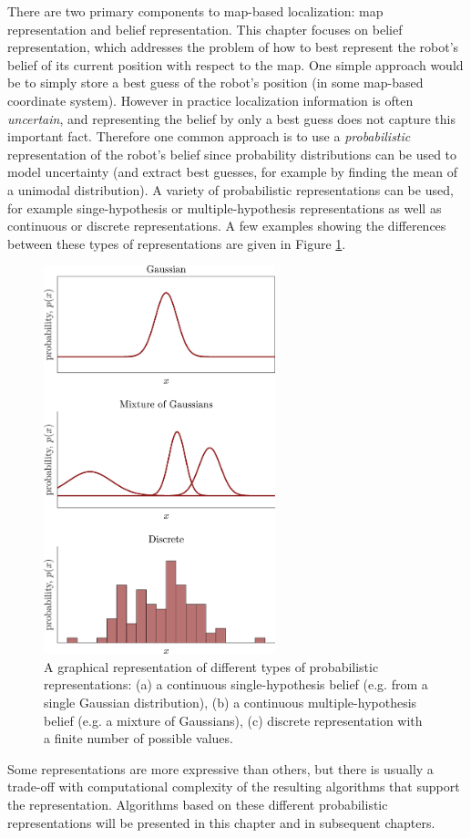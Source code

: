 There are two primary components to map-based localization: map representation and belief representation. This chapter focuses on belief representation, which addresses the problem of how to best represent the robot's belief of its current position with respect to the map. One simple approach would be to simply store a best guess of the robot's position (in some map-based coordinate system). However in practice localization information is often \textit{uncertain}, and representing the belief by only a best guess does not capture this important fact. Therefore one common approach is to use a \textit{probabilistic} representation of the robot's belief since probability distributions can be used to model uncertainty (and extract best guesses, for example by finding the mean of a unimodal distribution). A variety of probabilistic representations can be used, for example singe-hypothesis or multiple-hypothesis representations as well as continuous or discrete representations. A few examples showing the differences between these types of representations are given in Figure \ref{fig:belief-representation}.
\begin{figure}[ht!]
	\centering
    \includegraphics[width=0.6\textwidth]{tex/figs/ch13_figs/distributions.png}
    \caption{A graphical representation of different types of probabilistic representations: (a) a continuous single-hypothesis belief (e.g. from a single Gaussian distribution), (b) a continuous multiple-hypothesis belief (e.g. a mixture of Gaussians), (c) discrete representation with a finite number of possible values.}
    \label{fig:belief-representation}
\end{figure}
Some representations are more expressive than others, but there is usually a trade-off with computational complexity of the resulting algorithms that support the representation. Algorithms based on these different probabilistic representations will be presented in this chapter and in subsequent chapters.

